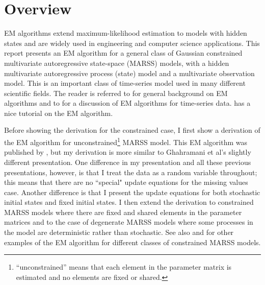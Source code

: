 \documentclass[]{article}
\begin{document}
\section{Overview}

EM algorithms extend maximum-likelihood estimation to models with hidden states and are widely used in engineering and computer science applications. This report presents an EM algorithm for a general class of Gaussian constrained multivariate autoregressive state-space (MARSS) models, with a hidden multivariate autoregressive process (state) model and a multivariate observation model.  This is an important class of time-series model used in many different scientific fields. The reader is referred to \citet{McLachlanKrishnan2008} for general background on EM algorithms and to \citet{Harvey1989} for a discussion of EM algorithms for time-series data.  \citet{Borman2009} has a nice tutorial on the EM algorithm.  

Before showing the derivation for the constrained case, I first show a derivation of the EM algorithm  for unconstrained\footnote{``unconstrained'' means that each element in the parameter matrix is estimated and no elements are fixed or shared.} MARSS model. This EM algorithm was published by \citet{ShumwayStoffer1982}, but my derivation is more similar to Ghahramani et al's \citep{GhahramaniHinton1996, RoweisGhahramani1999} slightly different presentation.  One difference in my presentation and all these previous presentations, however, is that I treat the data as a random variable throughout; this means that there are no ``special" update equations for the missing values case.  Another difference is that I present the update equations for both stochastic initial states and fixed initial states.  I then extend the derivation to constrained MARSS models where there are fixed and shared elements in the parameter matrices and to the case of degenerate MARSS models where some processes in the model are deterministic rather than stochastic. See also \citet{Wuetal1996} and \citet{Zuuretal2003a} for other examples of the EM algorithm for different classes of constrained MARSS models.
\end{document}
